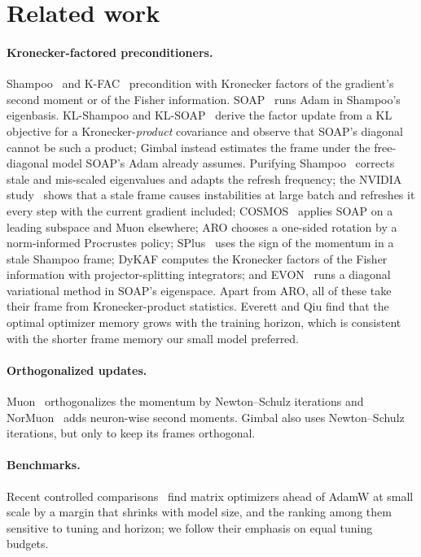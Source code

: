 \section{Related work}
\label{sec:related}

\paragraph{Kronecker-factored preconditioners.} Shampoo~\citep{gupta2018shampoo,anil2020scalable}
and K-FAC~\citep{martens2015kfac} precondition with Kronecker factors of the gradient's second
moment or of the Fisher information. SOAP~\citep{vyas2024soap} runs Adam in Shampoo's eigenbasis.
KL-Shampoo and KL-SOAP~\citep{lin2025klshampoo} derive the factor update from a KL objective for a
Kronecker-\emph{product} covariance and observe that SOAP's diagonal cannot be such a product;
Gimbal instead estimates the frame under the free-diagonal model SOAP's Adam already assumes.
Purifying Shampoo~\citep{eschenhagen2025purifying} corrects stale and mis-scaled eigenvalues and
adapts the refresh frequency; the NVIDIA study~\citep{nvidia2026soapmuon} shows that a stale frame
causes instabilities at large batch and refreshes it every step with the current gradient
included; COSMOS~\citep{liu2025cosmos} applies SOAP on a leading subspace and Muon elsewhere; ARO
\citep{gong2026aro} chooses a one-sided rotation by a norm-informed Procrustes policy;
SPlus~\citep{frans2025splus} uses the sign of the momentum in a stale Shampoo frame; DyKAF
\citep{yudin2025dykaf} computes the Kronecker factors of the Fisher information with
projector-splitting integrators; and EVON~\citep{minut2026soapbubbles} runs a diagonal variational
method in SOAP's eigenspace. Apart from ARO, all of these take their frame from Kronecker-product
statistics. Everett and Qiu
\citep{everett2026memory} find that the optimal optimizer memory grows with the training horizon,
which is consistent with the shorter frame memory our small model preferred.

\paragraph{Orthogonalized updates.} Muon~\citep{jordan2024muon,liu2025muonscalable} orthogonalizes
the momentum by Newton--Schulz iterations and NorMuon~\citep{li2025normuon} adds neuron-wise
second moments. Gimbal also uses Newton--Schulz iterations, but only to keep its frames orthogonal.

\paragraph{Benchmarks.} Recent controlled comparisons~\citep{wen2025fantastic,semenov2025benchmarking}
find matrix optimizers ahead of AdamW at small scale by a margin that shrinks with model size, and
the ranking among them sensitive to tuning and horizon; we follow their emphasis on equal tuning
budgets.

